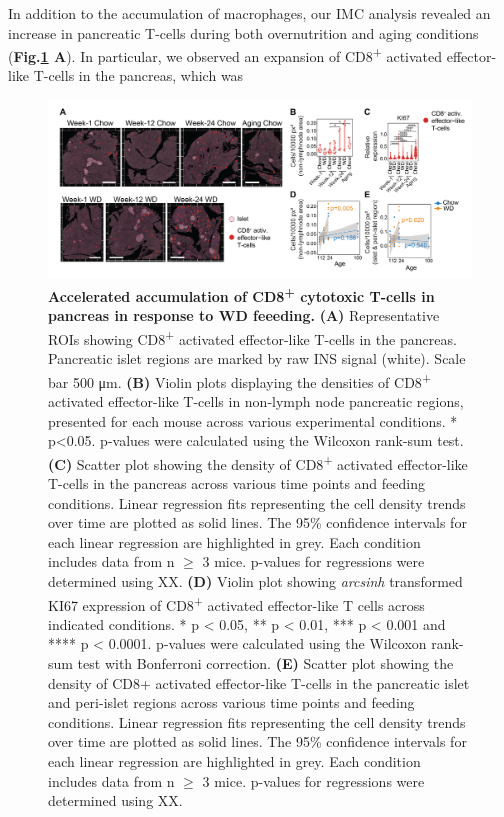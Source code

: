 In addition to the accumulation of macrophages, our IMC analysis revealed an increase in pancreatic T-cells during both overnutrition and aging conditions (\textbf{Fig.\ref{fig2-10} A}). In particular, we observed an expansion of CD8\textsuperscript{+} activated effector-like T-cells in the pancreas, which was 

\begin{figure}[H]
\centering
\includegraphics[width=\linewidth]{Chapter4/Fig/F2-10-02.png}
\caption[res-tcells1]{\textbf{Accelerated accumulation of CD8\textsuperscript{+} cytotoxic T-cells in pancreas in response to WD feeeding.} \textbf{(A)} Representative ROIs showing CD8\textsuperscript{+} activated effector-like T-cells in the pancreas. Pancreatic islet regions are marked by raw INS signal (white).  Scale bar 500 μm. \textbf{(B)} Violin plots displaying the densities of CD8\textsuperscript{+} activated effector-like T-cells in non-lymph node pancreatic regions, presented for each mouse across various experimental conditions. * p<0.05. p-values were calculated using the Wilcoxon rank-sum test. \textbf{(C)} Scatter plot showing the density of CD8\textsuperscript{+} activated effector-like T-cells in the pancreas across various time points and feeding conditions. Linear regression fits representing the cell density trends over time are plotted as solid lines. The 95\% confidence intervals for each linear regression are highlighted in grey. Each condition includes data from n $\geq$ 3 mice. p-values for regressions were determined using XX. \textbf{(D)} Violin plot showing \textit{arcsinh} transformed KI67 expression of CD8\textsuperscript{+} activated effector-like T cells across indicated conditions. * p < 0.05, ** p < 0.01, *** p < 0.001 and **** p < 0.0001. p-values were calculated using the Wilcoxon rank-sum test with Bonferroni correction. \textbf{(E)} Scatter plot showing the density of CD8+ activated effector-like T-cells in the pancreatic islet and peri-islet regions across various time points and feeding conditions. Linear regression fits representing the cell density trends over time are plotted as solid lines. The 95\% confidence intervals for each linear regression are highlighted in grey. Each condition includes data from n $\geq$ 3 mice. p-values for regressions were determined using XX. 
}
\label{fig2-10}
\end{figure}

